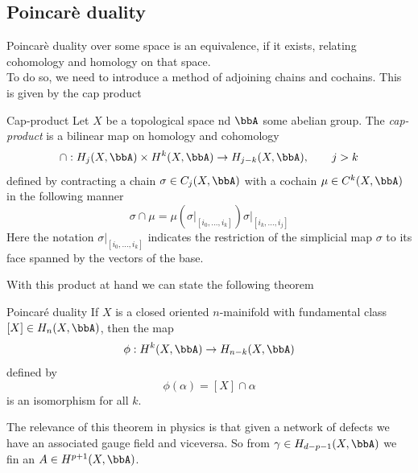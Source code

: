 \subsection{Poincarè duality}
Poincarè duality over some space is an equivalence, if it exists, relating cohomology and homology on that space.\\
To do so, we need to introduce a method of adjoining chains and cochains. This is given by the cap product
\begin{defn}{Cap-product}{}
	Let $X$ be a topological space nd $\bbA$ some abelian group. The \textit{cap-product} is a bilinear map on homology and cohomology
	\begin{equation}
		\cap:H_j(X,\bbA)\times H^k(X,\bbA)\rightarrow H_{j-k}(X,\bbA),\qquad j>k
	\end{equation}
	defined by contracting a chain $\sigma\in C_j(X,\bbA)$ with a cochain $\mu\in C^k(X,\bbA)$ in the following manner
	\begin{equation}
		\sigma \cap \mu=\mu(\left.\sigma\right|_{[i_0,\ldots,i_k]})\left.\sigma\right|_{[i_k,\ldots,i_j]}
	\end{equation}
	Here the notation $\left.\sigma\right|_{[i_0,\ldots,i_k]}$ indicates the restriction of the simplicial map $\sigma$ to its face spanned by the vectors of the base.
\end{defn}
With this product at hand we can state the following theorem
\begin{thm}{Poincaré duality}{}
	If $X$ is a closed oriented $n$-mainifold with fundamental class $[X]\in H_n(X,\bbA)$, then the map 
	\begin{equation}
		\phi: H^k(X,\bbA)\rightarrow H_{n-k}(X,\bbA)
	\end{equation}
	defined by
	\begin{equation}
		\phi(\alpha)=[X]\cap \alpha
	\end{equation}
	is an isomorphism for all $k$.
\end{thm}
The relevance of this theorem in physics is that given a network of defects we have an associated gauge field and viceversa. So from $\gamma\in H_{d-p-1}(X,\bbA)$ we fin an $A\in H^{p+1}(X,\bbA)$. 

